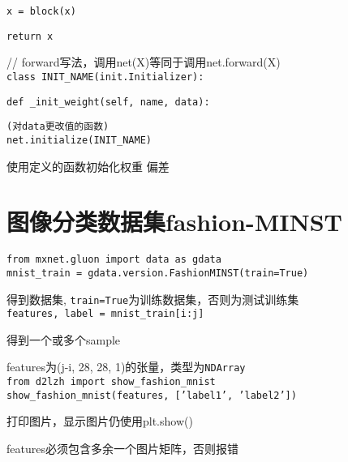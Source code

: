 \documentclass[UTF8]{ctexart}
\begin{document}
  \quad \quad \texttt{x = block(x)}

  \quad \quad \texttt{return x}

  // forward写法，调用net(X)等同于调用net.forward(X)\\
\texttt{class INIT\_NAME(init.Initializer):}

  \texttt{def \_init\_weight(self, name, data):}

  \quad \texttt{(对data更改值的函数)}\\
\texttt{net.initialize(INIT\_NAME)}

  使用定义的函数初始化权重 偏差

\section{图像分类数据集fashion-MINST}
\noindent \texttt{from mxnet.gluon import data as gdata}\\
\texttt{mnist\_train = gdata.version.FashionMINST(train=True)} 

  得到数据集, \texttt{train=True}为训练数据集，否则为测试训练集\\
\texttt{features, label = mnist\_train[i:j]}
  
  得到一个或多个sample
  
  features为(j-i, 28, 28, 1)的张量，类型为\texttt{NDArray}\\
\texttt{from d2lzh import show\_fashion\_mnist}\\
\texttt{show\_fashion\_mnist(features, ['label1', 'label2'])}

  打印图片，显示图片仍使用plt.show()

  features必须包含多余一个图片矩阵，否则报错
\end{document}
